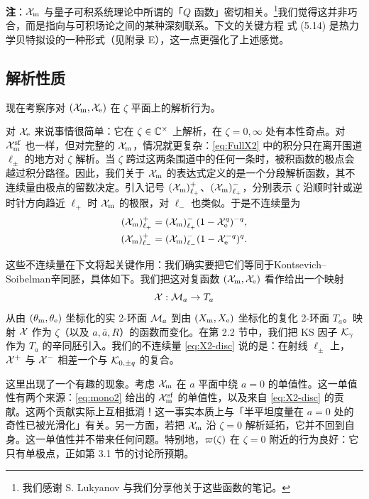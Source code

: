 \bigskip
\textbf{注}：$\mathcal{X}_{\mathrm{m}}$ 与量子可积系统理论中所谓的「$Q$ 函数」密切相关。\footnote{我们感谢 S. Lukyanov 与我们分享他关于这些函数的笔记。}我们觉得这并非巧合，而是指向与可积场论之间的某种深刻联系。下文的关键方程 式 (5.14) 是热力学贝特拟设的一种形式（见附录 E），这一点更强化了上述感觉。%

\subsection{解析性质}

现在考察序对 $(\mathcal{X}_{\mathrm{m}}, \mathcal{X}_{\mathrm{e}})$ 在 $\zeta$ 平面上的解析行为。

对 $\mathcal{X}_{\mathrm{e}}$ 来说事情很简单：它在 $\zeta \in \mathbb{C}^\times$ 上解析，在 $\zeta=0,\infty$ 处有本性奇点。对 $\mathcal{X}_{\mathrm{m}}^{\mathrm{sf}}$ 也一样，但对完整的 $\mathcal{X}_{\mathrm{m}}$，情况就更复杂：\eqref{eq:FullX2} 中的积分只在离开围道 $\ell_\pm$ 的地方对 $\zeta$ 解析。当 $\zeta$ 跨过这两条围道中的任何一条时，被积函数的极点会越过积分路径。因此，我们关于 $\mathcal{X}_{\mathrm{m}}$ 的表达式定义的是一个分段解析函数，其不连续量由极点的留数决定。引入记号 $(\mathcal{X}_{\mathrm{m}})_{\ell_+}^{+}$、$(\mathcal{X}_{\mathrm{m}})_{\ell_+}^{-}$，分别表示 $\zeta$ 沿顺时针或逆时针方向趋近 $\ell_+$ 时 $\mathcal{X}_{\mathrm{m}}$ 的极限，对 $\ell_-$ 也类似。于是不连续量为
\begin{subequations}  \label{eq:X2-disc}
\begin{align}
(\mathcal{X}_{\mathrm{m}})_{\ell_+}^{+} &= (\mathcal{X}_{\mathrm{m}})_{\ell_+}^{-} (1 - \mathcal{X}_{\mathrm{e}}^q)^{-q}, \label{eq:X2-disc-a} \\
(\mathcal{X}_{\mathrm{m}})_{\ell_-}^{+} &= (\mathcal{X}_{\mathrm{m}})_{\ell_-}^{-} (1 - \mathcal{X}_{\mathrm{e}}^{-q})^q.
\end{align}
\end{subequations}

这些不连续量在下文将起关键作用：我们确实要把它们等同于Kontsevich–Soibelman辛同胚，具体如下。我们把这对复函数 $(\mathcal{X}_{\mathrm{m}}, \mathcal{X}_{\mathrm{e}})$ 看作给出一个映射
\begin{equation}
\mathcal{X}: \mathcal{M}_a \to T_a
\end{equation}
从由 $(\theta_{\mathrm{m}}, \theta_{\mathrm{e}})$ 坐标化的实 2-环面 $\mathcal{M}_a$ 到由 $(X_{\mathrm{m}}, X_{\mathrm{e}})$ 坐标化的复化 2-环面 $T_a$。映射 $\mathcal{X}$ 作为 $\zeta$（以及 $a, \bar{a}, R$）的函数而变化。在第 2.2 节中，我们把 KS 因子 $\mathcal{K}_\gamma$ 作为 $T_a$ 的辛同胚引入。我们的不连续量 \eqref{eq:X2-disc} 说的是：在射线 $\ell_\pm$ 上，$\mathcal{X}^{+}$ 与 $\mathcal{X}^{-}$ 相差一个与 $\mathcal{K}_{0,\pm q}$ 的复合。%

这里出现了一个有趣的现象。考虑 $\mathcal{X}_{\mathrm{m}}$ 在 $a$ 平面中绕 $a=0$ 的单值性。这一单值性有两个来源：\eqref{eq:mono2} 给出的 $\mathcal{X}_{\mathrm{m}}^{\mathrm{sf}}$ 的单值性，以及来自 \eqref{eq:X2-disc} 的贡献。这两个贡献实际上互相抵消！这一事实本质上与「半平坦度量在 $a=0$ 处的奇性已被光滑化」有关。另一方面，若把 $\mathcal{X}_{\mathrm{m}}$ 沿 $\zeta = 0$ 解析延拓，它并不回到自身。这一单值性并不带来任何问题。特别地，$\varpi(\zeta)$ 在 $\zeta = 0$ 附近的行为良好：它只有单极点，正如第 3.1 节的讨论所预期。%

